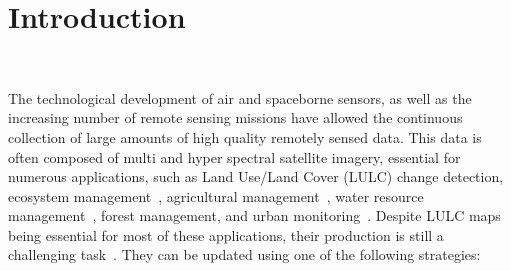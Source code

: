 \documentclass[remotesensing,article,submit,moreauthors,pdftex]{Definitions/mdpi}
\begin{document}
\section{Introduction}~\label{sec:introduction}

The technological development of air and spaceborne sensors, as well as the
increasing number of remote sensing missions have allowed the continuous
collection of large amounts of high quality remotely sensed data. This data is
often composed of multi and hyper spectral satellite imagery, essential for
numerous applications, such as Land Use/Land Cover (LULC) change detection,
ecosystem management~\cite{Nagai2020}, agricultural
management~\cite{Huang2018}, water resource management~\cite{Wang2018}, forest
management, and urban monitoring~\cite{Khatami2016}. Despite LULC maps being
essential for most of these applications, their production is still a
challenging task~\cite{Gavade2019, Wulder2018}. They can be updated using
one of the following strategies:
\end{document}
